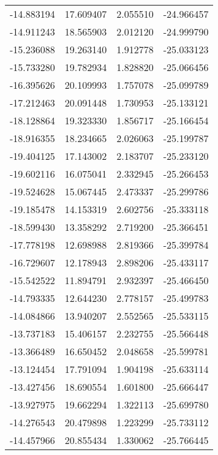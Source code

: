 \begin{tabular}{rrrr}
      -14.883194 &        17.609407 &    2.055510 & -24.966457 \\
      -14.911243 &        18.565903 &    2.012120 & -24.999790 \\
      -15.236088 &        19.263140 &    1.912778 & -25.033123 \\
      -15.733280 &        19.782934 &    1.828820 & -25.066456 \\
      -16.395626 &        20.109993 &    1.757078 & -25.099789 \\
      -17.212463 &        20.091448 &    1.730953 & -25.133121 \\
      -18.128864 &        19.323330 &    1.856717 & -25.166454 \\
      -18.916355 &        18.234665 &    2.026063 & -25.199787 \\
      -19.404125 &        17.143002 &    2.183707 & -25.233120 \\
      -19.602116 &        16.075041 &    2.332945 & -25.266453 \\
      -19.524628 &        15.067445 &    2.473337 & -25.299786 \\
      -19.185478 &        14.153319 &    2.602756 & -25.333118 \\
      -18.599430 &        13.358292 &    2.719200 & -25.366451 \\
      -17.778198 &        12.698988 &    2.819366 & -25.399784 \\
      -16.729607 &        12.178943 &    2.898206 & -25.433117 \\
      -15.542522 &        11.894791 &    2.932397 & -25.466450 \\
      -14.793335 &        12.644230 &    2.778157 & -25.499783 \\
      -14.084866 &        13.940207 &    2.552565 & -25.533115 \\
      -13.737183 &        15.406157 &    2.232755 & -25.566448 \\
      -13.366489 &        16.650452 &    2.048658 & -25.599781 \\
      -13.124454 &        17.791094 &    1.904198 & -25.633114 \\
      -13.427456 &        18.690554 &    1.601800 & -25.666447 \\
      -13.927975 &        19.662294 &    1.322113 & -25.699780 \\
      -14.276543 &        20.479898 &    1.223299 & -25.733112 \\
      -14.457966 &        20.855434 &    1.330062 & -25.766445 \\

\end{tabular}
